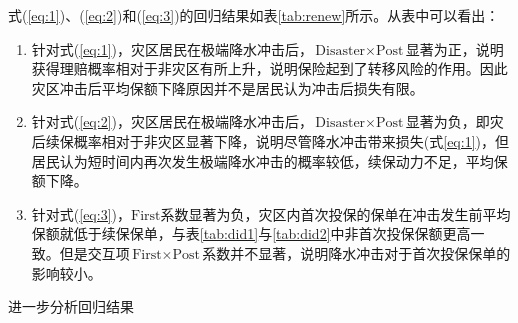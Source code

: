 式(\ref{eq:1})、(\ref{eq:2})和(\ref{eq:3})的回归结果如表\ref{tab:renew}所示。从表中可以看出：
\begin{enumerate}
    \item 针对式(\ref{eq:1})，灾区居民在极端降水冲击后，$\text{Disaster}\times\text{Post}$显著为正，说明获得理赔概率相对于非灾区有所上升，说明保险起到了转移风险的作用。因此灾区冲击后平均保额下降原因并不是居民认为冲击后损失有限。
    \item 针对式(\ref{eq:2})，灾区居民在极端降水冲击后，$\text{Disaster}\times\text{Post}$显著为负，即灾后续保概率相对于非灾区显著下降，说明尽管降水冲击带来损失(式\ref{eq:1})，但居民认为短时间内再次发生极端降水冲击的概率较低，续保动力不足，平均保额下降。
    \item 针对式(\ref{eq:3})，$\text{First}$系数显著为负，灾区内首次投保的保单在冲击发生前平均保额就低于续保保单，与表\ref{tab:did1}与\ref{tab:did2}中非首次投保保额更高一致。但是交互项$\text{First}\times\text{Post}$系数并不显著，说明降水冲击对于首次投保保单的影响较小。
\end{enumerate}

\begin{table}[ht]
    \caption{进一步分析回归结果}\label{tab:renew}
    \centering
    
\end{table}